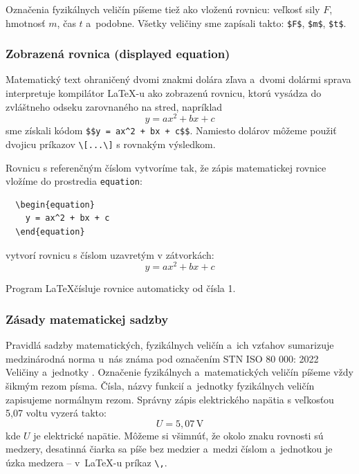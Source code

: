 Označenia fyzikálnych veličín píšeme tiež ako vloženú rovnicu:
veľkosť sily $F$, hmotnosť $m$, čas $t$ a~podobne.
Všetky veličiny sme zapísali takto: \verb|$F$|,
\verb|$m$|, \verb|$t$|.

\subsubsection{Zobrazená rovnica (displayed equation)}
Matematický text ohraničený dvomi znakmi dolára zľava
a~dvomi dolármi sprava interpretuje kompilátor \LaTeX-u
ako zobrazenú rovnicu, ktorú vysádza do zvláštneho odseku
zarovnaného na stred, napríklad
$$
  y = ax^2 + bx + c
$$
sme získali kódom \verb|$$y = ax^2 + bx + c$$|.
Namiesto dolárov môžeme použiť dvojicu príkazov
\verb|\[...\]| s rovnakým výsledkom.

Rovnicu s referenčným číslom vytvoríme tak, že zápis matematickej
rovnice vložíme do prostredia \verb|equation|:
\begin{verbatim}
  \begin{equation}
    y = ax^2 + bx + c
  \end{equation}
\end{verbatim}
vytvorí rovnicu s číslom uzavretým v zátvorkách:
\begin{equation}
  y = ax^2 + bx + c
\end{equation}

Program \LaTeX čísluje rovnice automaticky od čísla 1.

\subsubsection{Zásady matematickej sadzby}
Pravidlá sadzby matematických, fyzikálnych veličín a~ich vzťahov 
sumarizuje medzinárodná norma u~nás známa pod označením
STN ISO 80 000: 2022 Veličiny a~jednotky \cite{iso800001, iso800002}.
Označenie fyzikálnych a~matematických veličín píšeme vždy
šikmým rezom písma.
Čísla, názvy funkcií a~jednotky fyzikálnych veličín zapisujeme 
normálnym rezom.
Správny zápis elektrického napätia s veľkosťou 5,07 voltu
vyzerá takto:
\begin{equation}\label{Eq:quantity}
  U = 5{,}07\,\mathrm{V}
\end{equation}
kde $U$ je elektrické napätie.
Môžeme si všimnúť, že okolo znaku rovnosti sú medzery,
desatinná čiarka sa píše bez medzier a~medzi číslom a~jednotkou
je úzka medzera -- v~\LaTeX-u príkaz \verb|\,|.

